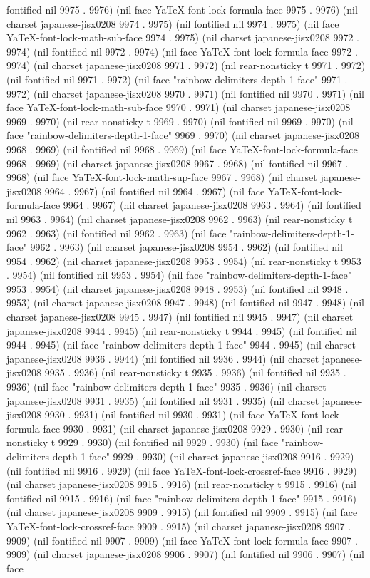 fontified nil 9975 . 9976) (nil face YaTeX-font-lock-formula-face 9975 . 9976) (nil charset japanese-jisx0208 9974 . 9975) (nil fontified nil 9974 . 9975) (nil face YaTeX-font-lock-math-sub-face 9974 . 9975) (nil charset japanese-jisx0208 9972 . 9974) (nil fontified nil 9972 . 9974) (nil face YaTeX-font-lock-formula-face 9972 . 9974) (nil charset japanese-jisx0208 9971 . 9972) (nil rear-nonsticky t 9971 . 9972) (nil fontified nil 9971 . 9972) (nil face "rainbow-delimiters-depth-1-face" 9971 . 9972) (nil charset japanese-jisx0208 9970 . 9971) (nil fontified nil 9970 . 9971) (nil face YaTeX-font-lock-math-sub-face 9970 . 9971) (nil charset japanese-jisx0208 9969 . 9970) (nil rear-nonsticky t 9969 . 9970) (nil fontified nil 9969 . 9970) (nil face "rainbow-delimiters-depth-1-face" 9969 . 9970) (nil charset japanese-jisx0208 9968 . 9969) (nil fontified nil 9968 . 9969) (nil face YaTeX-font-lock-formula-face 9968 . 9969) (nil charset japanese-jisx0208 9967 . 9968) (nil fontified nil 9967 . 9968) (nil face YaTeX-font-lock-math-sup-face 9967 . 9968) (nil charset japanese-jisx0208 9964 . 9967) (nil fontified nil 9964 . 9967) (nil face YaTeX-font-lock-formula-face 9964 . 9967) (nil charset japanese-jisx0208 9963 . 9964) (nil fontified nil 9963 . 9964) (nil charset japanese-jisx0208 9962 . 9963) (nil rear-nonsticky t 9962 . 9963) (nil fontified nil 9962 . 9963) (nil face "rainbow-delimiters-depth-1-face" 9962 . 9963) (nil charset japanese-jisx0208 9954 . 9962) (nil fontified nil 9954 . 9962) (nil charset japanese-jisx0208 9953 . 9954) (nil rear-nonsticky t 9953 . 9954) (nil fontified nil 9953 . 9954) (nil face "rainbow-delimiters-depth-1-face" 9953 . 9954) (nil charset japanese-jisx0208 9948 . 9953) (nil fontified nil 9948 . 9953) (nil charset japanese-jisx0208 9947 . 9948) (nil fontified nil 9947 . 9948) (nil charset japanese-jisx0208 9945 . 9947) (nil fontified nil 9945 . 9947) (nil charset japanese-jisx0208 9944 . 9945) (nil rear-nonsticky t 9944 . 9945) (nil fontified nil 9944 . 9945) (nil face "rainbow-delimiters-depth-1-face" 9944 . 9945) (nil charset japanese-jisx0208 9936 . 9944) (nil fontified nil 9936 . 9944) (nil charset japanese-jisx0208 9935 . 9936) (nil rear-nonsticky t 9935 . 9936) (nil fontified nil 9935 . 9936) (nil face "rainbow-delimiters-depth-1-face" 9935 . 9936) (nil charset japanese-jisx0208 9931 . 9935) (nil fontified nil 9931 . 9935) (nil charset japanese-jisx0208 9930 . 9931) (nil fontified nil 9930 . 9931) (nil face YaTeX-font-lock-formula-face 9930 . 9931) (nil charset japanese-jisx0208 9929 . 9930) (nil rear-nonsticky t 9929 . 9930) (nil fontified nil 9929 . 9930) (nil face "rainbow-delimiters-depth-1-face" 9929 . 9930) (nil charset japanese-jisx0208 9916 . 9929) (nil fontified nil 9916 . 9929) (nil face YaTeX-font-lock-crossref-face 9916 . 9929) (nil charset japanese-jisx0208 9915 . 9916) (nil rear-nonsticky t 9915 . 9916) (nil fontified nil 9915 . 9916) (nil face "rainbow-delimiters-depth-1-face" 9915 . 9916) (nil charset japanese-jisx0208 9909 . 9915) (nil fontified nil 9909 . 9915) (nil face YaTeX-font-lock-crossref-face 9909 . 9915) (nil charset japanese-jisx0208 9907 . 9909) (nil fontified nil 9907 . 9909) (nil face YaTeX-font-lock-formula-face 9907 . 9909) (nil charset japanese-jisx0208 9906 . 9907) (nil fontified nil 9906 . 9907) (nil face 